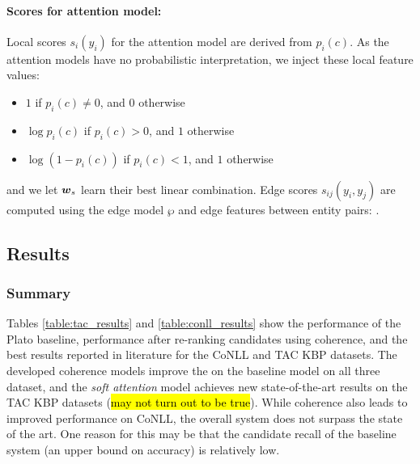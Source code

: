 \paragraph*{Scores for attention model:}
Local scores $s_i(y_i)$ for the attention model are derived from
$p_i(c)$.  As the attention models have no probabilistic
interpretation, we inject these local feature values:
\begin{itemize}
\item $1$ if $p_i(c)\ne 0$, and 0 otherwise
\item $\log p_i(c)$ if $p_i(c)>0$, and $1$ otherwise
\item $\log(1-p_i(c))$ if $p_i(c)<1$, and $1$ otherwise
\end{itemize}
and we let $\boldsymbol{w}_s$ learn their best linear combination.  Edge scores
$s_{ij}(y_i, y_j)$ are computed using the edge model $\wp$ and edge
features between entity pairs:
.


\subsection{Results}

\subsubsection{Summary}


Tables \ref{table:tac_results} and \ref{table:conll_results} show the performance of the Plato baseline, performance after re-ranking candidates using coherence, and the best results reported in literature for the CoNLL and TAC KBP datasets. The developed coherence models improve the on the baseline model on all three dataset, and the \emph{soft attention} model achieves new state-of-the-art results on the TAC KBP datasets (\hl{may not turn out to be true}). 
 While coherence also leads to improved performance on CoNLL, the overall system does not surpass the state of the art. One reason for this may be that the candidate recall of the baseline system (an upper bound on accuracy) is relatively low. 


